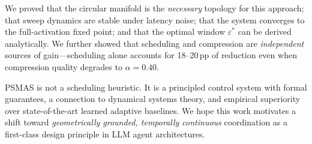 \documentclass[10pt,twocolumn]{article}
\theoremstyle{plain}
\theoremstyle{definition}
\theoremstyle{remark}
\newcommand{\eps}{\varepsilon}
\begin{document}
We proved that the circular manifold is the \emph{necessary} topology
for this approach; that sweep dynamics are stable under latency noise;
that the system converges to the full-activation fixed point; and that
the optimal window $\eps^*$ can be derived analytically.  We further
showed that scheduling and compression are \emph{independent} sources
of gain---scheduling alone accounts for 18--20\,pp of reduction even
when compression quality degrades to $\alpha=0.40$.

PSMAS is not a scheduling heuristic.  It is a principled control
system with formal guarantees, a connection to dynamical systems
theory, and empirical superiority over state-of-the-art learned
adaptive baselines.  We hope this work motivates a shift toward
\emph{geometrically grounded, temporally continuous} coordination as
a first-class design principle in LLM agent architectures.
\end{document}
